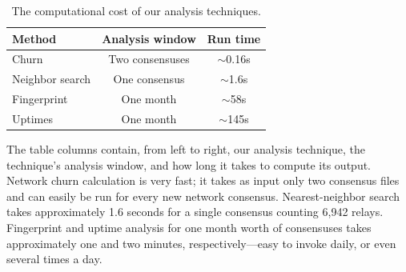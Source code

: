 \begin{table}[t]
	\small
	\centering
	\begin{tabular}{lcc}
	\hline
	\textbf{Method} & \textbf{Analysis window} & \textbf{Run time} \\
	\hline
	Churn & Two consensuses & $\sim$0.16s \\
	Neighbor search & One consensus & $\sim$1.6s \\
	Fingerprint & One month & $\sim$58s \\
	Uptimes & One month & $\sim$145s \\
	\hline
	\end{tabular}
	\caption{The computational cost of our analysis techniques.}
	\label{tab:exp-deployment}
\end{table}

The table columns contain, from left to right, our analysis technique, the
technique's analysis window, and how long it takes to compute its output.
Network churn calculation is very fast; it takes as input only two consensus
files and can easily be run for every new network consensus.  Nearest-neighbor
search takes approximately 1.6 seconds for a single consensus counting 6,942
relays.  Fingerprint and uptime analysis for one month worth of consensuses
takes approximately one and two minutes, respectively---easy to invoke daily, or
even several times a day.
